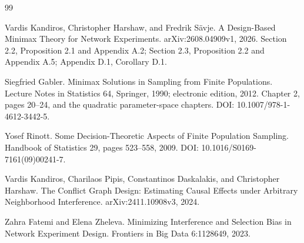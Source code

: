 \documentclass{article}
\begin{document}
\begin{thebibliography}{99}

   Vardis Kandiros, Christopher Harshaw, and Fredrik Sävje. A Design-Based Minimax Theory for Network Experiments. arXiv:2608.04909v1, 2026. Section 2.2, Proposition 2.1 and Appendix A.2; Section 2.3, Proposition 2.2 and Appendix A.5; Appendix D.1, Corollary D.1.

   Siegfried Gabler. Minimax Solutions in Sampling from Finite Populations. Lecture Notes in Statistics 64, Springer, 1990; electronic edition, 2012. Chapter 2, pages 20--24, and the quadratic parameter-space chapters. DOI: 10.1007/978-1-4612-3442-5.

   Yosef Rinott. Some Decision-Theoretic Aspects of Finite Population Sampling. Handbook of Statistics 29, pages 523--558, 2009. DOI: 10.1016/S0169-7161(09)00241-7.

   Vardis Kandiros, Charilaos Pipis, Constantinos Daskalakis, and Christopher Harshaw. The Conflict Graph Design: Estimating Causal Effects under Arbitrary Neighborhood Interference. arXiv:2411.10908v3, 2024.

   Zahra Fatemi and Elena Zheleva. Minimizing Interference and Selection Bias in Network Experiment Design. Frontiers in Big Data 6:1128649, 2023.

\end{thebibliography}
\end{document}
